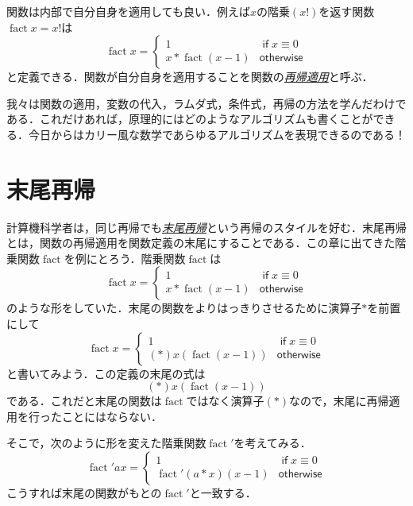 \documentclass[a5paper,draft]{jsbook}
\newcommand{\keyword}[1]{{\underline{\emph{#1}}}}
\newcommand{\mathSpecialFunction}[1]{\operatorname{\mathrm{#1}}}
\newcommand{\mathFactorial}{\mathSpecialFunction{fact}}
\newcommand{\mathKeyword}[1]{\operatorname{\textsf{#1}}}
\newcommand{\mathIf}{\mathKeyword{if}}
\newcommand{\mathOtherwise}{\mathKeyword{otherwise}}
\begin{document}
関数は内部で自分自身を適用しても良い．例えば$x$の階乗$(x!)$を返す関数$\mathFactorial x=x!$は
\begin{equation}
\mathFactorial x=\begin{cases}
1&\mathIf x\equiv0\\
x*\mathFactorial(x-1)&\mathOtherwise
\end{cases}
\end{equation}
と定義できる．関数が自分自身を適用することを関数の\keyword{再帰適用}と呼ぶ．

我々は関数の適用，変数の代入，ラムダ式，条件式，再帰の方法を学んだわけである．これだけあれば，原理的にはどのようなアルゴリズムも書くことができる．今日からはカリー風な数学であらゆるアルゴリズムを表現できるのである！

\section{末尾再帰}

計算機科学者は，同じ再帰でも\keyword{末尾再帰}という再帰のスタイルを好む．末尾再帰とは，関数の再帰適用を関数定義の末尾にすることである．この章に出てきた階乗関数$\mathFactorial$を例にとろう．階乗関数$\mathFactorial$は
\begin{equation}
\mathFactorial x=\begin{cases}
1&\mathIf x\equiv0\\
x*\mathFactorial(x-1)&\mathOtherwise
\end{cases}
\end{equation}
のような形をしていた．末尾の関数をよりはっきりさせるために演算子$*$を前置にして
\begin{equation}
\mathFactorial x=\begin{cases}
1&\mathIf x\equiv0\\
(*)x(\mathFactorial(x-1))&\mathOtherwise
\end{cases}
\end{equation}
と書いてみよう．この定義の末尾の式は
\begin{equation}
(*)x(\mathFactorial(x-1))
\end{equation}
である．これだと末尾の関数は$\mathFactorial$ではなく演算子$(*)$なので，末尾に再帰適用を行ったことにはならない．

そこで，次のように形を変えた階乗関数$\mathFactorial'$を考えてみる．
\begin{equation}
\mathFactorial'ax=\begin{cases}
1&\mathIf x\equiv0\\
\mathFactorial'(a*x)(x-1)&\mathOtherwise
\end{cases}
\end{equation}
こうすれば末尾の関数がもとの$\mathFactorial'$と一致する．
\end{document}
